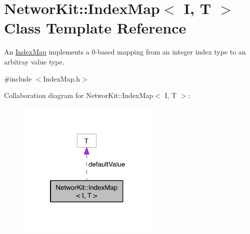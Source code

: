 \hypertarget{class_networ_kit_1_1_index_map}{\section{Networ\-Kit\-:\-:Index\-Map$<$ I, T $>$ Class Template Reference}
\label{class_networ_kit_1_1_index_map}
}


An \hyperlink{class_networ_kit_1_1_index_map}{Index\-Map} implements a 0-\/based mapping from an integer index type to an arbitray value type.  




{\ttfamily \#include $<$Index\-Map.\-h$>$}



Collaboration diagram for Networ\-Kit\-:\-:Index\-Map$<$ I, T $>$\-:\nopagebreak
\begin{figure}[H]
\begin{center}
\leavevmode
\includegraphics[width=192pt]{class_networ_kit_1_1_index_map__coll__graph}
\end{center}
\end{figure}
